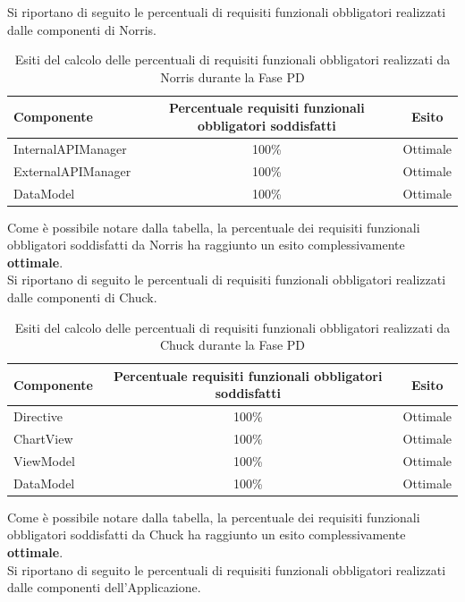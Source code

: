 					Si riportano di seguito le percentuali di requisiti funzionali obbligatori realizzati dalle componenti di Norris.
					\begin{table}[H]
						\centering
							\begin{tabu}{| l | c | c |}
								\hline
								Componente	& Percentuale requisiti funzionali obbligatori soddisfatti	& Esito		\\ \hline \hline
								InternalAPIManager	& 100\% 	& Ottimale  \\ \hline
								ExternalAPIManager  & 	100\%	& Ottimale  \\ \hline
								DataModel  & 	100\%	& Ottimale  \\ \hline
							\end{tabu}
						\caption{Esiti del calcolo delle percentuali di requisiti funzionali obbligatori realizzati da Norris durante la Fase PD}
					\end{table}
					Come è possibile notare dalla tabella, la percentuale dei requisiti funzionali obbligatori soddisfatti da Norris ha raggiunto un esito complessivamente \textbf{ottimale}.\\
					Si riportano di seguito le percentuali di requisiti funzionali obbligatori realizzati dalle componenti di Chuck.
					\begin{table}[H]
						\centering
							\begin{tabu}{| l | c | c |}
								\hline
								Componente	& Percentuale requisiti funzionali obbligatori soddisfatti	& Esito		\\ \hline \hline
								Directive  &	100\% 	& Ottimale  \\ \hline
								ChartView  & 	100\%	& Ottimale  \\ \hline
								ViewModel  & 	100\%	& Ottimale  \\ \hline
								DataModel  & 	100\%	& Ottimale  \\ \hline
							\end{tabu}
						\caption{Esiti del calcolo delle percentuali di requisiti funzionali obbligatori realizzati da Chuck durante la Fase PD}
					\end{table}
					Come è possibile notare dalla tabella, la percentuale dei requisiti funzionali obbligatori soddisfatti da Chuck ha raggiunto un esito complessivamente \textbf{ottimale}.\\
					Si riportano di seguito le percentuali di requisiti funzionali obbligatori realizzati dalle componenti dell'Applicazione.
